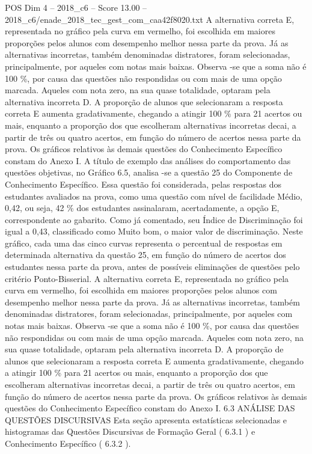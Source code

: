 \begin{textsample}{POS Dim 4 – 2018\_c6 – Score 13.00 – 2018\_c6/enade\_2018\_tec\_gest\_com\_caa42f8020.txt}
A alternativa correta E, representada no gráfico pela curva em vermelho, foi escolhida em maiores proporções pelos alunos com desempenho melhor nessa parte da prova.
Já as alternativas incorretas, também denominadas distratores, foram selecionadas, principalmente, por aqueles com notas mais baixas.
Observa -se que a soma não é 100 \%, por causa das questões não respondidas ou com mais de uma opção marcada.
Aqueles com nota zero, na sua quase totalidade, optaram pela alternativa incorreta D.
A proporção de alunos que selecionaram a resposta correta E aumenta gradativamente, chegando a atingir 100 \% para 21 acertos ou mais, enquanto a proporção dos que escolheram alternativas incorretas decai, a partir de três ou quatro acertos, em função do número de acertos nessa parte da prova.
Os gráficos relativos às demais questões do Conhecimento Específico constam do Anexo I.
A título de exemplo das análises do comportamento das questões objetivas, no Gráfico 6.5, analisa -se a questão 25 do Componente de Conhecimento Específico.
Essa questão foi considerada, pelas respostas dos estudantes avaliados na prova, como uma questão com nível de facilidade Médio, 0,42, ou seja, 42 \% dos estudantes assinalaram, acertadamente, a opção E, correspondente ao gabarito.
Como já comentado, seu Índice de Discriminação foi igual a 0,43, classificado como Muito bom, o maior valor de discriminação.
Neste gráfico, cada uma das cinco curvas representa o percentual de respostas em determinada alternativa da questão 25, em função do número de acertos dos estudantes nessa parte da prova, antes de possíveis eliminações de questões pelo critério Ponto-Bisserial.
A alternativa correta E, representada no gráfico pela curva em vermelho, foi escolhida em maiores proporções pelos alunos com desempenho melhor nessa parte da prova.
Já as alternativas incorretas, também denominadas distratores, foram selecionadas, principalmente, por aqueles com notas mais baixas.
Observa -se que a soma não é 100 \%, por causa das questões não respondidas ou com mais de uma opção marcada.
Aqueles com nota zero, na sua quase totalidade, optaram pela alternativa incorreta D.
A proporção de alunos que selecionaram a resposta correta E aumenta gradativamente, chegando a atingir 100 \% para 21 acertos ou mais, enquanto a proporção dos que escolheram alternativas incorretas decai, a partir de três ou quatro acertos, em função do número de acertos nessa parte da prova.
Os gráficos relativos às demais questões do Conhecimento Específico constam do Anexo I. 6.3 ANÁLISE DAS QUESTÕES DISCURSIVAS Esta seção apresenta estatísticas selecionadas e histogramas das Questões Discursivas de Formação Geral ( 6.3.1 ) e Conhecimento Específico ( 6.3.2 ).

\end{textsample}
